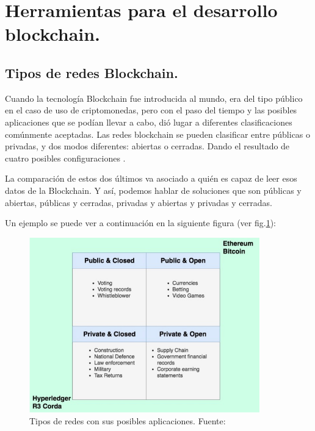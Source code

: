 \section{Herramientas para el desarrollo blockchain.}

\subsection{Tipos de redes Blockchain.}

Cuando la tecnología Blockchain fue introducida al mundo, era del tipo público en el caso de uso de criptomonedas, pero
con el paso del tiempo y las posibles aplicaciones que se podían llevar a cabo, dió lugar a diferentes clasificaciones 
comúnmente aceptadas. Las redes blockchain se pueden clasificar entre públicas o privadas, y dos modos diferentes: 
abiertas o cerradas. Dando el resultado de cuatro posibles configuraciones \cite{public-private-blockchain}.

\vspace{5mm}

\noindent La comparación de estos dos últimos va asociado a quién es capaz de leer esos datos de la Blockchain. Y así, 
podemos hablar de soluciones que son públicas y abiertas, públicas y cerradas, privadas y abiertas y privadas y 
cerradas.

\vspace{5mm}

\noindent Un ejemplo se puede ver a continuación en la siguiente figura (ver fig.\ref{fig:tipos-de-redes}):

\vspace{5mm}

\begin{figure}[ht!]
    \centering
    \includegraphics[width=10cm]{imagenes/herramientas/tipos_de_redes}
    \caption{Tipos de redes con sus posibles aplicaciones. Fuente: \cite{public-private-blockchain}}
    \label{fig:tipos-de-redes}
\end{figure}


